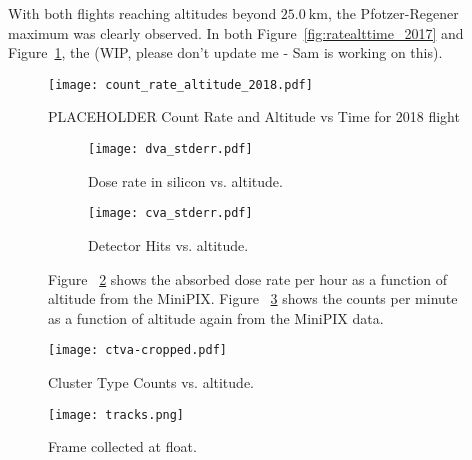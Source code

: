 With both flights reaching altitudes beyond $\SI{25.0}{\kilo\meter}$, the Pfotzer-Regener maximum was clearly observed.  In both Figure~\ref{fig:ratealttime_2017} and Figure~\ref{fig:ratealttime_2018}, the (WIP, please don't update me - Sam is working on this).



\begin{figure}[H]
\centering
\texttt{[image: count\_rate\_altitude\_2018.pdf]}
\caption{PLACEHOLDER Count Rate and Altitude vs Time for 2018 flight}
\label{fig:ratealttime_2018}
\end{figure}

\begin{figure}[H]
\centering
\begin{subfigure}{.5\textwidth}
  \centering
  \texttt{[image: dva\_stderr.pdf]}
  \caption{Dose rate in silicon vs. altitude.}
  \label{fig:sub1}
\end{subfigure}%
\begin{subfigure}{.5\textwidth}
  \centering
  \texttt{[image: cva\_stderr.pdf]}
  \caption{Detector Hits vs. altitude.}
  \label{fig:sub2}
\end{subfigure}
\caption{Figure ~\ref{fig:sub1} shows the absorbed dose rate per hour as a function of altitude from the MiniPIX.  Figure ~\ref{fig:sub2} shows the counts per minute as a function of altitude again from the MiniPIX data.}
\label{fig:test}
\end{figure}

\begin{figure}[H]
\centering
\texttt{[image: ctva-cropped.pdf]}
\caption{Cluster Type Counts vs. altitude.}
\end{figure}

\begin{figure}[H]
\centering
\texttt{[image: tracks.png]}
\caption{Frame collected at float.}
\end{figure}

